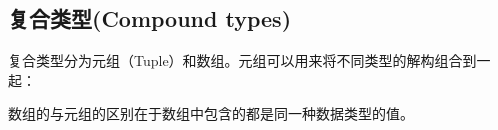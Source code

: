 \documentclass[12pt]{article}
\begin{document}
\begin{Shaded}
\begin{Highlighting}[]
\OperatorTok{=} \OperatorTok{;}
\OperatorTok{:} \OperatorTok{=} \OperatorTok{;}
\OperatorTok{=} \OperatorTok{;}
\end{Highlighting}
\end{Shaded}

\subsection{复合类型(Compound types)}\label{ux590dux5408ux7c7bux578bcompound-types}

复合类型分为元组（Tuple）和数组。元组可以用来将不同类型的解构组合到一起：

\begin{Shaded}
\begin{Highlighting}[]
\OperatorTok{:}\NormalTok{ (}\OperatorTok{,} \NormalTok{) }\OperatorTok{=}\NormalTok{ (}\OperatorTok{,} \NormalTok{)}\OperatorTok{;}

\OperatorTok{,}\OperatorTok{=}\OperatorTok{;} 
\OperatorTok{=}\OperatorTok{;}    
\end{Highlighting}
\end{Shaded}

数组的与元组的区别在于数组中包含的都是同一种数据类型的值。

\begin{Shaded}
\begin{Highlighting}[]
\OperatorTok{=}\NormalTok{ [}\OperatorTok{,} \OperatorTok{,} \NormalTok{]}\OperatorTok{;}
\OperatorTok{:}\NormalTok{ [}\OperatorTok{;} \NormalTok{] }\OperatorTok{=}\NormalTok{ [}\OperatorTok{,} \OperatorTok{,} \OperatorTok{,} \OperatorTok{,} \NormalTok{]}\OperatorTok{;} 
\OperatorTok{=}\NormalTok{ [}\OperatorTok{;} \NormalTok{]}\OperatorTok{;}                   
\end{Highlighting}
\end{Shaded}
\end{document}
